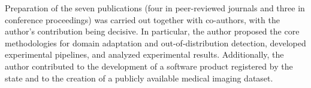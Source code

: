 Preparation of the seven publications (four in peer-reviewed journals and three in conference proceedings) was carried out together with co-authors, with the author’s contribution being decisive. In particular, the author proposed the core methodologies for domain adaptation and out-of-distribution detection, developed experimental pipelines, and analyzed experimental results. Additionally, the author contributed to the development of a software product registered by the state and to the creation of a publicly available medical imaging dataset.

